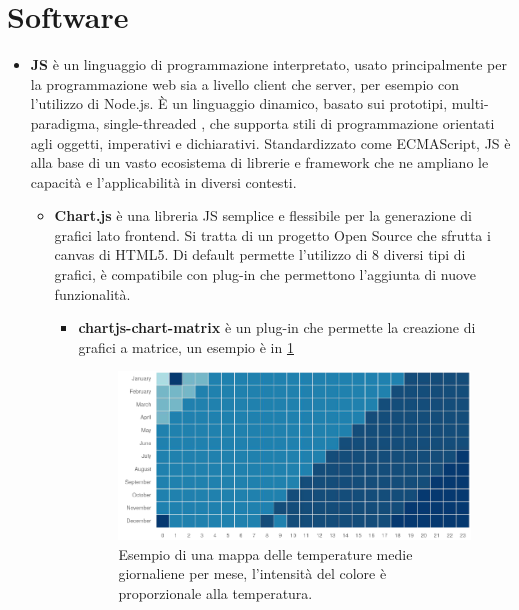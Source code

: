 \documentclass[12pt,a4paper,openright,twoside]{book}
\begin{document}
\section{Software}

    \begin{itemize}[noitemsep]
        \item \textbf{\ac{JS}} è un linguaggio di programmazione interpretato, usato principalmente per la programmazione web sia a livello client che server, per esempio con l'utilizzo di Node.js. È un linguaggio dinamico, basato sui prototipi, multi-paradigma, single-threaded , che supporta stili di programmazione orientati agli oggetti, imperativi e dichiarativi. Standardizzato come ECMAScript, \ac{JS} è alla base di un vasto ecosistema di librerie e framework che ne ampliano le capacità e l'applicabilità in diversi contesti.
        \begin{itemize}[noitemsep]
            \item \textbf{Chart.js} è una libreria \ac{JS} semplice e flessibile per la generazione di grafici lato frontend. Si tratta di un progetto Open Source che sfrutta i canvas di HTML5. Di default permette l'utilizzo di 8 diversi tipi di grafici, è compatibile con plug-in che permettono l'aggiunta di nuove funzionalità.
            \begin{itemize}[noitemsep]
                \item \textbf{chartjs-chart-matrix} è un plug-in che permette la creazione di grafici a matrice, un esempio è in \cref{fig.matrix_chart_example}
                \begin{figure}
                    \centering
                    \includegraphics[width=0.9\linewidth]{./figures/matrix-chart-example.png}
                    \caption{Esempio di una mappa delle temperature medie giornaliene per mese, l'intensità del colore è proporzionale alla temperatura.}
                    \label{fig.matrix_chart_example}
                \end{figure}

\end{itemize}
\end{itemize}
\end{itemize}
\end{document}
